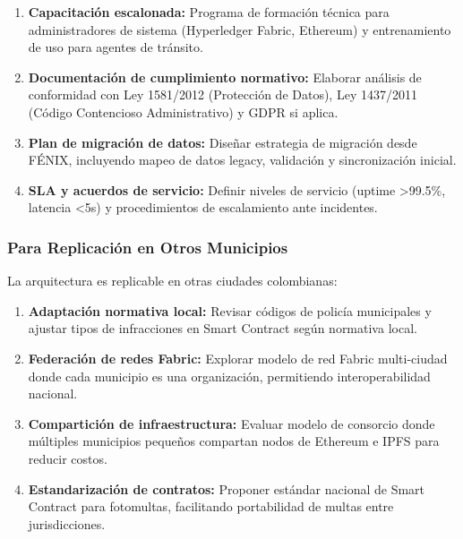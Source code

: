 \begin{enumerate}
    \item \textbf{Capacitación escalonada:} Programa de formación técnica para administradores de sistema (Hyperledger Fabric, Ethereum) y entrenamiento de uso para agentes de tránsito.
    
    \item \textbf{Documentación de cumplimiento normativo:} Elaborar análisis de conformidad con Ley 1581/2012 (Protección de Datos), Ley 1437/2011 (Código Contencioso Administrativo) y GDPR si aplica.
    
    \item \textbf{Plan de migración de datos:} Diseñar estrategia de migración desde FÉNIX, incluyendo mapeo de datos legacy, validación y sincronización inicial.
    
    \item \textbf{SLA y acuerdos de servicio:} Definir niveles de servicio (uptime >99.5\%, latencia <5s) y procedimientos de escalamiento ante incidentes.
\end{enumerate}

\subsubsection{Para Replicación en Otros Municipios}

La arquitectura es replicable en otras ciudades colombianas:

\begin{enumerate}
    \item \textbf{Adaptación normativa local:} Revisar códigos de policía municipales y ajustar tipos de infracciones en Smart Contract según normativa local.
    
    \item \textbf{Federación de redes Fabric:} Explorar modelo de red Fabric multi-ciudad donde cada municipio es una organización, permitiendo interoperabilidad nacional.
    
    \item \textbf{Compartición de infraestructura:} Evaluar modelo de consorcio donde múltiples municipios pequeños compartan nodos de Ethereum e IPFS para reducir costos.
    
    \item \textbf{Estandarización de contratos:} Proponer estándar nacional de Smart Contract para fotomultas, facilitando portabilidad de multas entre jurisdicciones.
\end{enumerate}

